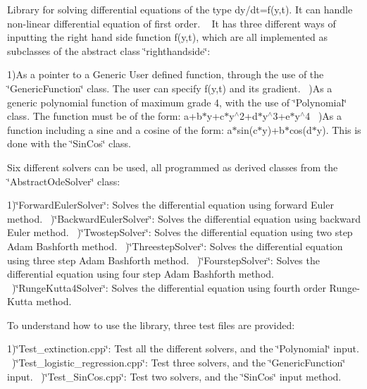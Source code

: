 Library for solving differential equations of the type dy/dt=f(y,t). It can handle non-\/linear differential equation of first order. ~\newline
 It has three different ways of inputting the right hand side function f(y,t), which are all implemented as subclasses of the abstract class \char`\"{}righthandside\char`\"{}\+:

1)As a pointer to a Generic User defined function, through the use of the \char`\"{}\+Generic\+Function\char`\"{} class. The user can specify f(y,t) and its gradient. ~)As a generic polynomial function of maximum grade 4, with the use of \char`\"{}\+Polynomial\char`\"{} class. The function must be of the form\+: a+b$\ast$y+c$\ast$y$^\wedge$2+d$\ast$y$^\wedge$3+e$\ast$y$^\wedge$4 ~)As a function including a sine and a cosine of the form\+: a$\ast$sin(c$\ast$y)+b$\ast$cos(d$\ast$y). This is done with the \char`\"{}\+Sin\+Cos\char`\"{} class. ~\newline


Six different solvers can be used, all programmed as derived classes from the \char`\"{}\+Abstract\+Ode\+Solver\char`\"{} class\+:

1)\char`\"{}\+Forward\+Euler\+Solver\char`\"{}\+: Solves the differential equation using forward Euler method. ~)\char`\"{}\+Backward\+Euler\+Solver\char`\"{}\+: Solves the differential equation using backward Euler method. ~)\char`\"{}\+Twostep\+Solver\char`\"{}\+: Solves the differential equation using two step Adam Bashforth method. ~)\char`\"{}\+Threestep\+Solver\char`\"{}\+: Solves the differential equation using three step Adam Bashforth method. ~)\char`\"{}\+Fourstep\+Solver\char`\"{}\+: Solves the differential equation using four step Adam Bashforth method. ~)\char`\"{}\+Runge\+Kutta4\+Solver\char`\"{}\+: Solves the differential equation using fourth order Runge-\/\+Kutta method. ~\newline


To understand how to use the library, three test files are provided\+:

1)\char`\"{}\+Test\+\_\+extinction.\+cpp\char`\"{}\+: Test all the different solvers, and the \char`\"{}\+Polynomial\char`\"{} input. ~)\char`\"{}\+Test\+\_\+logistic\+\_\+regression.\+cpp\char`\"{}\+: Test three solvers, and the \char`\"{}\+Generic\+Function\char`\"{} input. ~)\char`\"{}\+Test\+\_\+\+Sin\+Cos.\+cpp\char`\"{}\+: Test two solvers, and the \char`\"{}\+Sin\+Cos\char`\"{} input method.

